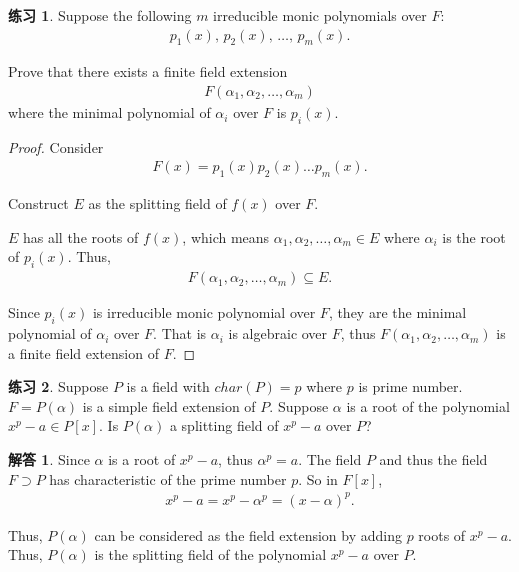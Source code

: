 \documentclass[utf8]{ctexbook}
\theoremstyle{definition}
\newtheorem{exercise}{练习}[section]
\newtheorem*{soln}{解答}
\begin{document}
\begin{exercise}
Suppose the following $m$ irreducible monic polynomials over $F$:
\begin{align*}
p_1(x), \, p_2 (x), \, \ldots , \, p_m(x) .
\end{align*}

Prove that there exists a finite field extension 
\begin{align*}
F(\alpha_1, \alpha_2, \ldots, \alpha_m)
\end{align*}
where the minimal polynomial of $\alpha_i$ over $F$ is $p_i (x)$.
\end{exercise}

\begin{proof}
Consider
\begin{align*}
F(x) = p_1 (x) p_2 (x) \ldots p_m (x) .
\end{align*}

Construct $E$ as the splitting field of $f(x)$ over $F$.

$E$ has all the roots of $f(x)$, which means $\alpha_1, \alpha_2, \ldots, \alpha_m \in E$ where $\alpha_i$ is the root of $p_i (x)$. Thus,
\begin{align*}
F(\alpha_1, \alpha_2, \ldots, \alpha_m) \subseteq E .
\end{align*}

Since $p_i (x)$ is irreducible monic polynomial over $F$, they are the minimal polynomial of $\alpha_i$ over $F$. That is $\alpha_i$ is algebraic over $F$, thus $ F(\alpha_1, \alpha_2, \ldots, \alpha_m)  $ is a finite field extension of $F$.

\end{proof}


\begin{exercise}
Suppose $P$ is a field with $char(P) = p$ where $p$ is prime number. $F = P (\alpha)$ is a simple field extension of $P$. Suppose $\alpha$ is a root of the polynomial $x^p - a \in P[x]$. Is $P(\alpha)$ a splitting field of $x^p -a$ over $P$?

\end{exercise}

\begin{soln}
Since $\alpha$ is a root of $x^p -a$, thus $\alpha^p = a$. The field $P$ and thus the field $F \supset P$ has characteristic of the prime number $p$. So in $F[x]$,
\begin{align*}
x^p -a = x^p - \alpha^p  = (x - \alpha)^p .
\end{align*}

Thus, $P(\alpha)$ can be considered as the field extension by adding $p$ roots of $x^p -a$. Thus, $P(\alpha)$ is the splitting field of the polynomial $x^p -a $ over $P$.


\end{soln}
\end{document}
